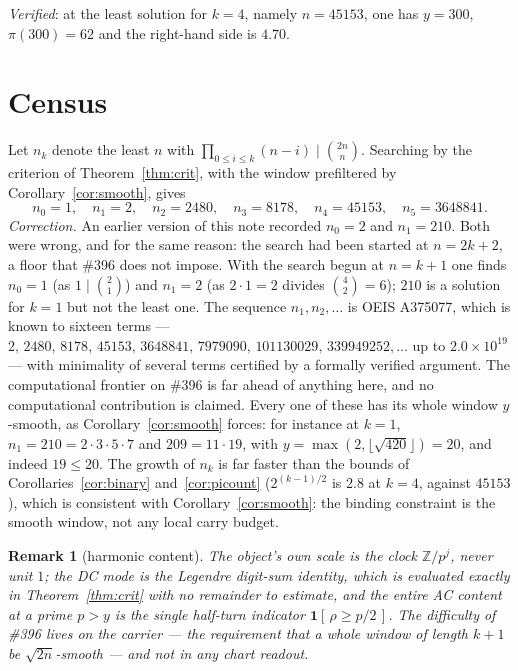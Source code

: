 \documentclass[11pt]{article}
\newtheorem{remark}[theorem]{Remark}
\begin{document}
\emph{Verified}: at the least solution for $k=4$, namely $n=45153$, one has $y=300$,
$\pi(300)=62$ and the right-hand side is $4.70$.

\section{Census}

Let $n_k$ denote the least $n$ with $\prod_{0\le i\le k}(n-i)\mid\binom{2n}{n}$.  Searching by
the criterion of Theorem~\ref{thm:crit}, with the window prefiltered by
Corollary~\ref{cor:smooth}, gives
\[
  n_0=1,\quad n_1=2,\quad n_2=2480,\quad n_3=8178,\quad n_4=45153,\quad n_5=3648841 .
\]
\emph{Correction.} An earlier version of this note recorded $n_0=2$ and $n_1=210$.  Both were
wrong, and for the same reason: the search had been started at $n=2k+2$, a floor that \#396 does
not impose.  With the search begun at $n=k+1$ one finds $n_0=1$ (as $1\mid\binom21$) and
$n_1=2$ (as $2\cdot1=2$ divides $\binom42=6$); $210$ is a solution for $k=1$ but not the least
one.  The sequence $n_1,n_2,\dots$ is OEIS A375077, which is known to sixteen terms ---
$2,\,2480,\,8178,\,45153,\,3648841,\,7979090,\,101130029,\,339949252,\dots$ up to
$2.0\times10^{19}$ --- with minimality of several terms certified by a formally verified
argument.  The computational frontier on \#396 is far ahead of anything here, and no
computational contribution is claimed.
Every one of these has its whole window $y$-smooth, as Corollary~\ref{cor:smooth} forces:
for instance at $k=1$, $n_1=210=2\cdot3\cdot5\cdot7$ and $209=11\cdot19$, with
$y=\max(2,\lfloor\sqrt{420}\rfloor)=20$, and indeed $19\le20$.  The growth of $n_k$ is far
faster than the bounds of Corollaries~\ref{cor:binary} and~\ref{cor:picount}
($2^{(k-1)/2}$ is $2.8$ at $k=4$, against $45153$), which is consistent with
Corollary~\ref{cor:smooth}: the binding constraint is the smooth window, not any local
carry budget.

\begin{remark}[harmonic content]
The object's own scale is the clock $\mathbb Z/p^{j}$, never unit $1$; the DC mode is the
Legendre digit-sum identity, which is evaluated \emph{exactly} in Theorem~\ref{thm:crit}
with no remainder to estimate, and the entire AC content at a prime $p>y$ is the single
half-turn indicator $\mathbf 1[\,\rho\ge p/2\,]$.  The difficulty of \#396 lives on the
carrier --- the requirement that a whole window of length $k+1$ be $\sqrt{2n}$-smooth ---
and not in any chart readout.
\end{remark}
\end{document}
